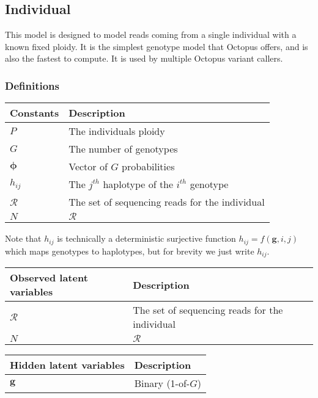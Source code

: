 \documentclass{article}
\begin{document}
\subsection{Individual}

This model is designed to model reads coming from a single individual with a known fixed ploidy. It is the simplest genotype model that Octopus offers, and is also the fastest to compute. It is used by multiple Octopus variant callers.

\subsubsection{Definitions}

\begin{center}
\begin{tabular}{ll}
Constants & Description \\
\hline
$P$ & The individuals ploidy \\
$G$ & The number of genotypes \\
$\boldsymbol{\phi}$ & Vector of $G$ probabilities \\
$h_{ij}$ & The $j^{th}$ haplotype of the $i^{th}$ genotype \\
$\mathcal{R}$ & The set of sequencing reads for the individual \\
$N$ & $\mathcal{R}$ \\
\hline
\end{tabular}
\end{center}

Note that $h_{ij}$ is technically a deterministic surjective function $h_{ij} = f(\boldsymbol{g}, i, j)$ which maps genotypes to haplotypes, but for brevity we just write $h_{ij}$.

\begin{center}
\begin{tabular}{ll}
Observed latent variables & Description \\
\hline
$\mathcal{R}$ & The set of sequencing reads for the individual \\
$N$ & $\mathcal{R}$ \\
\hline
\end{tabular}
\end{center}

\begin{center}
\begin{tabular}{ll}
Hidden latent variables & Description \\
\hline
$\boldsymbol{g}$ & Binary (1-of-$G$) \\
\hline
\end{tabular}
\end{center}
\end{document}
